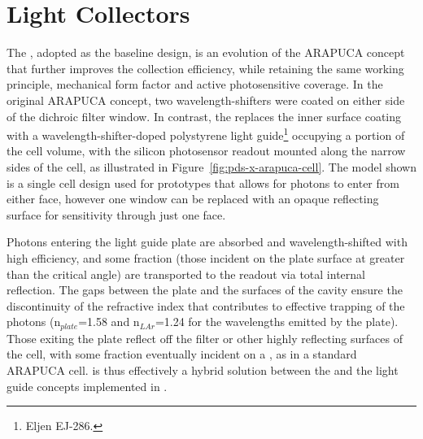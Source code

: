 

\section{Light Collectors}
\label{sec:fdsp-pd-lc}

The , adopted as the baseline design, is an evolution of the ARAPUCA concept that further improves the collection efficiency, while retaining the same working principle, mechanical form factor and active photosensitive coverage. 
 In the original ARAPUCA concept, two wavelength-shifters were coated on either side of the dichroic filter window. 
 In contrast, the  replaces the inner surface coating with a wavelength-shifter-doped %
 polystyrene light guide\footnote{Eljen EJ-286\texttrademark{}.} occupying a portion of the cell volume, with the silicon photosensor readout mounted along the narrow sides of the cell, as illustrated in Figure~\ref{fig:pds-x-arapuca-cell}. The model shown is a single cell design used for prototypes that allows for photons to enter from either face, however one window can be replaced with an opaque reflecting surface for sensitivity through just one face.

Photons entering the light guide plate are absorbed and wavelength-shifted with high efficiency, and some fraction (those incident on the plate surface at greater than the critical angle) are transported to the readout via total internal reflection. The  gaps between the plate and the surfaces of the cavity ensure the discontinuity of the refractive index that contributes to effective trapping of the photons (n$_{plate}$=1.58 and n$_{LAr}$=1.24 for the wavelengths emitted by the plate).
Those exiting the plate reflect off the filter or other highly reflecting surfaces of the cell, with some fraction eventually incident on a , as in a standard ARAPUCA cell.
 is thus effectively a hybrid solution between the  and the  light guide concepts implemented in .



